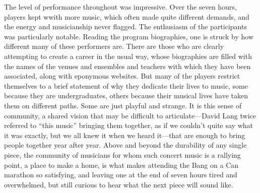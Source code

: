 The level of performance throughout was impressive. Over the seven hours, players kept wwith more music, which often made quite different demands, and the energy and musicianship never flagged. The enthusiasm of the participants was particularly notable. Reading the program biographies, one is struck by how different many of these performers are. There are those who are clearly attempting to create a career in the usual way, whose biographies are filled with the names of the venues and ensembles and teachers with which they have been associated, along with eponymous websites. But many of the players restrict themselves to a brief statement of why they dedicate their lives to music, some because they are undergraduates, others because their musical lives have taken them on different paths. Some are just playful and strange. It is this sense of community, a shared vision that may be difficult to articulate—David Lang twice referred to “this music” bringing them together, as if we couldn’t quite say what it was exactly, but we all knew it when we heard it—that are enough to bring people together year after year. Above and beyond the durability of any single piece, the community of musicians for whom such concert music is a rallying point, a place to make a home, is what makes attending the Bang on a Can marathon so satisfying, and leaving one at the end of seven hours tired and overwhelmed, but still curious to hear what the next piece will sound like.